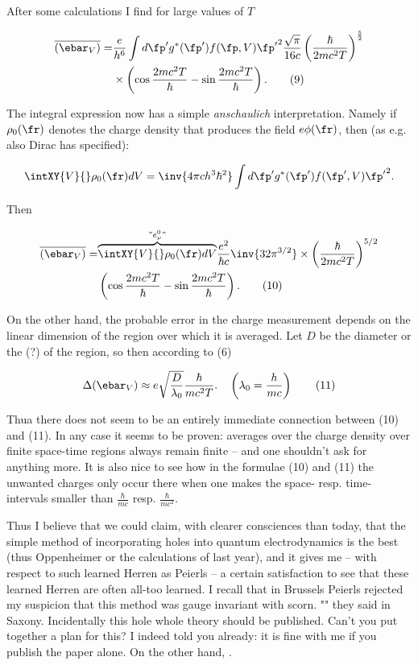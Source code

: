 \documentclass{article}
\newcommand{\nequ}[2]{
\begin{align*}
#1
\tag{#2}
\end{align*}
}
\newcommand{\uequ}[1]{
\begin{align*}
#1
\end{align*}
}
\begin{document}
After some calculations I find for large values of $T$
\nequ{
\overline{\left(\ebar_V\right)} 
 = &\frac{e}{h^6}\int{d\fp'}g^*(\fp')f(\fp,V){\fp'}^2
    \frac{\sqrt{\pi}}{16c}\left(\frac{\hbar}{2mc^2 T}\right)^{\frac{5}{2}}\\
   &\times \left(\cos{\frac{2mc^2 T}{\hbar}} - \sin{\frac{2mc^2 T}{\hbar}}\right).
}{9}
The integral expression now has a simple \textit{anschaulich} interpretation. Namely if $\rho_0(\fr)$ denotes the charge density that produces the field $e\phi(\fr)$, then (as e.g. also Dirac has specified):
\uequ{
\intXY{V}{}\rho_0(\fr){dV} = \inv{4\pi c h^3 \hbar^2}\int{d\fp'} g^*(\fp')f(\fp',V){\fp'}^2.
}
Then
\nequ{
\overline{\left(\ebar_V\right)} = 
  &\overset{"e^0_\nu"}{\overbrace{\intXY{V}{}\rho_0(\fr){dV}}}\frac{e^2}{\hbar c}\inv{32\pi^{3/2}}
  \times\left(\frac{\hbar}{2mc^2 T}\right)^{5/2}\\
  &\left(\cos{\frac{2mc^2 T}{\hbar}} - \sin{\frac{2mc^2 T}{\hbar}}\right).
}{10}
On the other hand, the probable error in the charge measurement depends on the linear dimension of the region over which it is averaged. Let $D$ be the diameter or the  (?) of the region, so then according to (6)
\nequ{
\Delta(\ebar_V) \approx e\sqrt{\frac{D}{\lambda_0}}\frac{\hbar}{mc^2 T}. \quad
\left(\lambda_0 = \frac{h}{mc}\right)
}{11}
Thua there does not seem to be an entirely immediate connection between (10) and (11).  In any case it seems to be proven: averages over the charge density over finite space-time regions always remain finite -- and one shouldn't ask for anything more. It is also nice to see how in the formulae (10) and (11) the unwanted charges only occur there when one makes the space- resp. time-intervals smaller than $\frac{\hbar}{mc}$ resp. $\frac{\hbar}{mc^2}$.

Thus I believe that we could claim, with clearer consciences than today, that the simple method of incorporating holes into quantum electrodynamics is the best (thus Oppenheimer or the calculations of last year), and it gives me -- with respect to such learned Herren as Peierls -- a certain satisfaction to see that these learned Herren are often all-too learned. I recall that in Brussels Peierls rejected my suspicion that this method was gauge invariant with scorn. "" they said in Saxony. Incidentally this hole whole theory should be published. Can't you put together a plan for this? I indeed told you already: it is fine with me if you publish the paper alone. On the other hand, .
\end{document}
